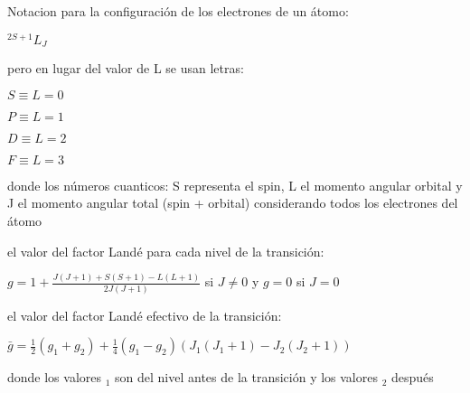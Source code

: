 \documentclass[10pt]{book}
\begin{document}
Notacion para la configuración de los electrones de un átomo:
\begin{description}
\item $^{2S+1}L_{J}$
\item pero en lugar del valor de L se usan letras:
\item $S \equiv L =0 $
\item $P \equiv L =1 $
\item $D \equiv L =2 $
\item $F \equiv L =3 $
\item donde los números cuanticos: S representa  el spin, 
L el momento angular orbital y J el momento angular total (spin + orbital) considerando todos los electrones del átomo
\item el valor del factor Landé para cada nivel de la transición:

$g = 1 + \frac{J(J+1) + S(S+1) - L(L+1)}{2J(J+1)}$ si $J \neq 0$ y $g=0$ si $J=0$

\item el valor del factor Landé efectivo de la transición:

$\bar{g} = \frac{1}{2}(g_1 + g_2) + \frac{1}{4}(g_1 - g_2)(J_1(J_1+1) - J_2(J_2 + 1))$

donde los valores $_1$ son del nivel antes de la transición y los valores $_2$ después


\end{description}
\end{document}
